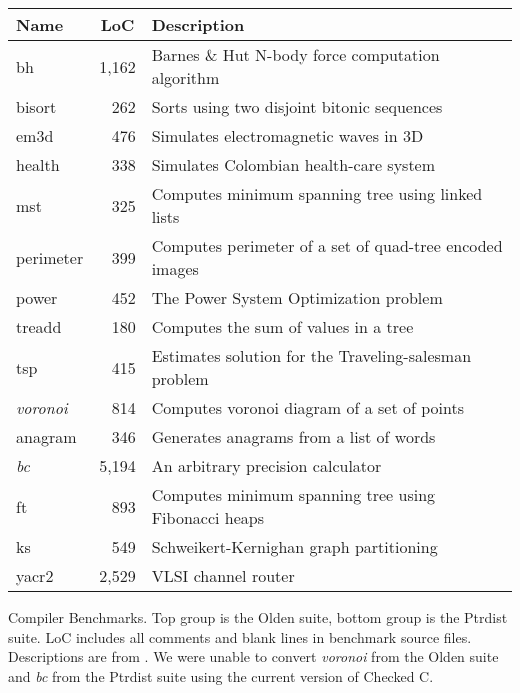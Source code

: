 \centering
\begin{tabular}{lrl}
\toprule
Name           & \multicolumn{1}{c}{LoC} & Description                                             \\
\midrule
bh             & 1,162 & Barnes \& Hut N-body force computation algorithm        \\
bisort         & 262   & Sorts using two disjoint bitonic sequences              \\
em3d           & 476   & Simulates electromagnetic waves in 3D                   \\
health         & 338   & Simulates Colombian health-care system                  \\
mst            & 325   & Computes minimum spanning tree using linked lists       \\
perimeter      & 399   & Computes perimeter of a set of quad-tree encoded images \\
power          & 452   & The Power System Optimization problem                   \\
treadd         & 180   & Computes the sum of values in a tree                    \\
tsp            & 415   & Estimates solution for the Traveling-salesman problem   \\
\emph{voronoi} & 814   & Computes voronoi diagram of a set of points             \\
\addlinespace
anagram        & 346   & Generates anagrams from a list of words                 \\
\emph{bc}      & 5,194 & An arbitrary precision calculator                       \\
ft             & 893   & Computes minimum spanning tree using Fibonacci heaps    \\
ks             & 549   & Schweikert-Kernighan graph partitioning                 \\
yacr2          & 2,529 & VLSI channel router                                     \\
\bottomrule
\end{tabular}
\caption{Compiler Benchmarks. Top group is the Olden suite, bottom
group is the Ptrdist suite. LoC includes all comments and blank lines
in benchmark source files. Descriptions are from
\cite{Rogers1995Olden,Austin1994Ptrdist}. We were unable to convert
\emph{voronoi} from the Olden suite and \emph{bc} from the Ptrdist suite using the current version of
Checked C.}
\label{tab:bmdesc}

